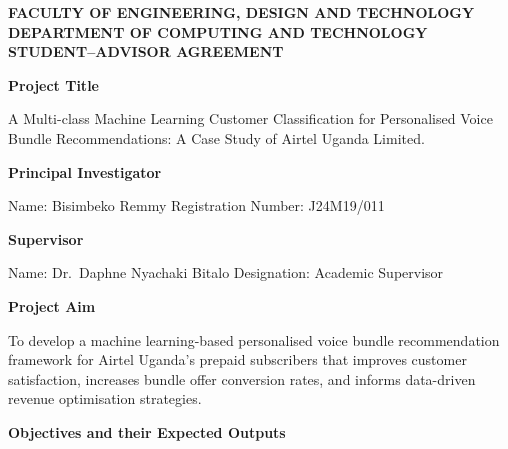 \begin{center}
\textbf{FACULTY OF ENGINEERING, DESIGN AND TECHNOLOGY}\\
\textbf{DEPARTMENT OF COMPUTING AND TECHNOLOGY}\\[0.3cm]
\textbf{STUDENT--ADVISOR AGREEMENT}
\end{center}

\vspace{0.3cm}
\noindent\textbf{Project Title}

A Multi-class Machine Learning Customer Classification for Personalised Voice Bundle Recommendations: A Case Study of Airtel Uganda Limited.

\vspace{0.3cm}
\noindent\textbf{Principal Investigator}

Name: Bisimbeko Remmy \hfill Registration Number: J24M19/011

\vspace{0.3cm}
\noindent\textbf{Supervisor}

Name: Dr.\ Daphne Nyachaki Bitalo \hfill Designation: Academic Supervisor

\vspace{0.3cm}
\noindent\textbf{Project Aim}

To develop a machine learning-based personalised voice bundle recommendation framework for Airtel Uganda's prepaid subscribers that improves customer satisfaction, increases bundle offer conversion rates, and informs data-driven revenue optimisation strategies.

\vspace{0.3cm}
\noindent\textbf{Objectives and their Expected Outputs}

